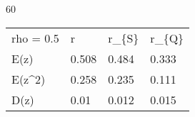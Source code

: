 
60
\begin{tabular}{llll}
\hline
 rho = 0.5 & r     & r\_\{S\} & r\_\{Q\} \\
 E(z)      & 0.508 & 0.484 & 0.333 \\
 E(z\^{}2)    & 0.258 & 0.235 & 0.111 \\
 D(z)      & 0.01  & 0.012 & 0.015 \\
\hline
\end{tabular}